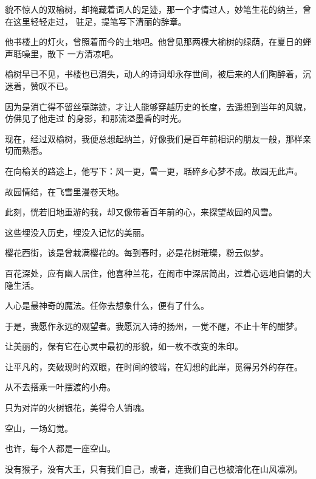 		貌不惊人的双榆树，却掩藏着词人的足迹，那一个才情过人，妙笔生花的纳兰，曾在这里轻轻走过，
	驻足，提笔写下清丽的辞章。

		他书楼上的灯火，曾照着而今的土地吧。他曾见那两棵大榆树的绿荫，在夏日的蝉声聒噪里，散下
	一方清凉吧。

		榆树早已不见，书楼也已消失，动人的诗词却永存世间，被后来的人们陶醉着，沉迷着，赞叹不已。

		因为是消亡得不留丝毫踪迹，才让人能够穿越历史的长度，去遥想到当年的风貌，仿佛见了他走过
	的身影，和那流溢墨香的时光。

		现在，经过双榆树，我便总想起纳兰，好像我们是百年前相识的朋友一般，那样亲切而熟悉。\par
		在向榆关的路途上，他写下：风一更，雪一更，聒碎乡心梦不成。故园无此声。\par
		故园情结，在飞雪里漫卷天地。\par
		此刻，恍若旧地重游的我，却又像带着百年前的心，来探望故园的风雪。

		这些埋没入历史，埋没入记忆的美丽。

		樱花西街，该是曾栽满樱花的。每到春时，必是花树璀璨，粉云似梦。\par
		百花深处，应有幽人居住，他喜种兰花，在闹市中深居简出，过着心远地自偏的大隐生活。\par
		人心是最神奇的魔法。任你去想象什么，便有了什么。

		于是，我愿作永远的观望者。我愿沉入诗的扬州，一觉不醒，不止十年的酣梦。\par
		让美丽的，保有它在心灵中最初的形貌，如一枚不改变的朱印。\par
		让平凡的，突破现时的双眼，在时间的彼端，在幻想的此岸，觅得另外的存在。

		从不去搭乘一叶摆渡的小舟。\par
		只为对岸的火树银花，美得令人销魂。

	\endwriting



		空山，一场幻觉。

		\vspace{1em}
		也许，每个人都是一座空山。\par
		没有猴子，没有大王，只有我们自己，或者，连我们自己也被溶化在山风凛冽。

